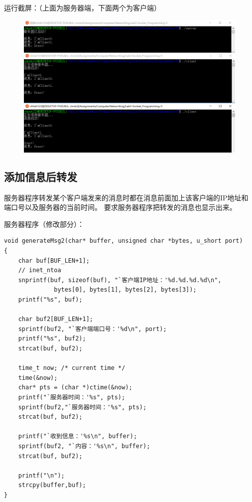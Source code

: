 \documentclass[logo,reportComp]{thesis}
\begin{document}
运行截屏：（上面为服务器端，下面两个为客户端）
\begin{figure}[H]
\centering
\includegraphics[width=\linewidth]{fig/p1.PNG}
\end{figure}

\subsection{添加信息后转发}
服务器程序转发某个客户端发来的消息时都在消息前面加上该客户端的IP地址和端口号以及服务器的当前时间。
要求服务器程序把转发的消息也显示出来。

服务器程序（修改部分）：
\begin{lstlisting}
void generateMsg2(char* buffer, unsigned char *bytes, u_short port)
{
    char buf[BUF_LEN+1];
    // inet_ntoa
    snprintf(buf, sizeof(buf), "`客户端IP地址：'%d.%d.%d.%d\n",
              bytes[0], bytes[1], bytes[2], bytes[3]);
    printf("%s", buf);

    char buf2[BUF_LEN+1];
    sprintf(buf2, "`客户端端口号：'%d\n", port);
    printf("%s", buf2);
    strcat(buf, buf2);

    time_t now; /* current time */
    time(&now);
    char* pts = (char *)ctime(&now);
    printf("`服务器时间：'%s", pts);
    sprintf(buf2,"`服务器时间：'%s", pts);
    strcat(buf, buf2);

    printf("`收到信息：'%s\n", buffer);
    sprintf(buf2, "`内容：'%s\n", buffer);
    strcat(buf, buf2);

    printf("\n");
    strcpy(buffer,buf);
}
\end{lstlisting}
\end{document}
